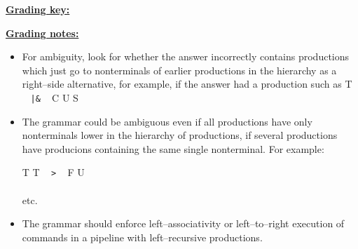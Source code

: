 \documentclass[11pt,fleqn]{article}
\begin{document}
\begin{enumerate}
\begin{info}{\textbf{\underline{Grading key:}}}
\begin{itemize}
            \end{itemize}

            \vspace{-2.5mm}

          \end{info}

          \begin{info}{\textbf{\underline{Grading notes:}}}

            \begin{itemize}

              \addtolength{\itemsep}{2mm}

              \item For ambiguity, look for whether the answer
                    incorrectly contains productions which just go to
                    nonterminals of earlier productions in the hierarchy as a
                    right--side alternative, for example, if the answer had a
                    production such as \hspace{2mm}
                               {T \ \: \texttt{|\&} \ \: C \midspc U \midspc S}

              \item The grammar could be ambiguous even if all productions
                    have only nonterminals lower in the hierarchy of
                    productions, if several productions have producions
                    containing the same single nonterminal.  For example:

                    \vspace{-1mm}

                    \hspace{.25in}
                    \begin{grammar}

                                 {T \midspc T \ \: \texttt{>} \ \: F \midspc U}
                      \\

                      \\

                      \textrm{etc.}

                    \end{grammar}

              \item The grammar should enforce left--associativity or
                    left--to--right execution of commands in a pipeline with
                    left--recursive productions.


\end{itemize}
\end{info}
\end{enumerate}
\end{document}
